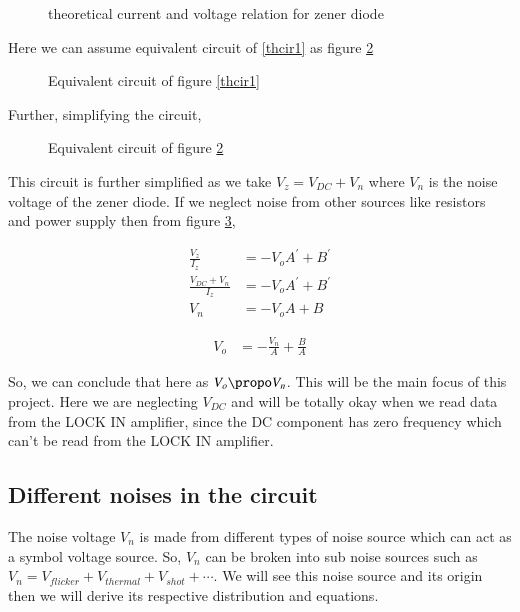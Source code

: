 \begin{figure}[hbt!]
\caption{theoretical current and voltage relation for zener diode \label{thiv}}
\end{figure}


Here we can assume equivalent circuit of \ref{thcir1} as figure \ref{thcir2} 

\begin{figure}[hbt!]
\caption{Equivalent circuit of figure \ref{thcir1} \label{thcir2}}
\end{figure}

Further, simplifying the circuit,

\begin{figure}[hbt!]
\caption{Equivalent circuit of figure \ref{thcir2} \label{thcir3}}
\end{figure}

This circuit is further simplified as we take $V_z = V_{DC} + V_n$ where $V_n$ is the noise voltage of the zener diode.
If we neglect noise from other sources like resistors and power supply then from figure \ref{thcir3},

\begin{align*}
\frac{V_z}{I_z} & = -V_oA^{\prime} +B^{\prime}\\
\frac{V_{DC}+V_n}{I_z} & =  -V_oA^{\prime} +B^{\prime}\\
V_n & = -V_oA+B
\end{align*}


\begin{align} \label{vo}
V_o & = -\frac{V_n}{A}+\frac{B}{A}
\end{align}



So, we can conclude that here as $V_o \propo V_n$.  This will be the main focus of this project. Here we are neglecting $V_{DC}$ and will be totally okay when we read data from the LOCK IN amplifier, since the DC component has zero frequency which can’t be read from the LOCK IN amplifier.

\subsection{Different noises in the circuit \label{thno}}

The noise voltage $V_n$ is made from different types of noise source which can act as a symbol voltage source. So, $V_n$ can be broken into sub noise sources such as $V_n = V_{flicker}+V_{thermal} + V_{shot} +\cdots$. We will see this noise source and its origin then we will derive its respective distribution and equations.\cite{reggiani1997monte}\cite{wilamowski2018fundamentals}

